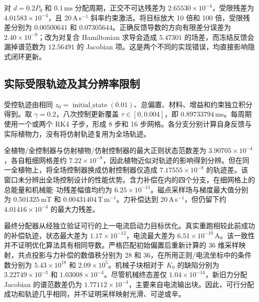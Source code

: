 对 $d=0.2P_0$ 和 $0.1$\,ms 分配周期，正交不可达残差为 $2.65530\times10^{-4}$，受限残差为 $4.01583\times10^{-4}$，且 20\,A\,s$^{-1}$ 斜率约束激活。将目标放大 10 倍和 100 倍，受限残差分别为 $0.00500641$ 和 $0.07305644$。正确反馈导数的方向有限差分误差为 $2.40\times10^{-9}$；改为对复合 Hamiltonian 求导会造成 $5.47301$ 的场差，而冻结反馈会漏掉谱范数为 $12.56491$ 的 Jacobian 项。这是两个不同的实现错误，均直接影响隐式闭环更新。

\subsection{实际受限轨迹及其分辨率限制}
受控轨迹由相同 $z_0=\operatorname{initial\_state}(0.01)$、总偏置、材料、增益和约束独立积分得到。取 $\gamma=0.2$，八次控制更新覆盖 $\tau\in[0,0.004]$，即 $0.89733794$\,ms。每周期使用一个或两个 RK4 子步，形成 8 步和 16 步网格。各分支分别计算自身反馈与实际植物力，没有将仿射轨迹复用为全场轨迹。

全植物/全控制器与仿射植物/仿射控制器的最大正则状态范数差为 $3.90705\times10^{-4}$，各自粗细网格差约 $7.22\times10^{-8}$，因此植物近似对轨迹的影响得到分辨。但在同一全植物上，将全场控制器换成仿射控制器仅造成 $7.17555\times10^{-8}$ 的轨迹差。该窗口未分辨出全场控制设计的性能优势。含力补偿在内的四个分支，在细网格上的总能量和机械能--功残差幅值均约为 $6.25\times10^{-11}$。磁点采样场与梯度最大值分别为 $0.501325$\,mT 和 $0.00431404$\,T\,m$^{-1}$。力补偿达到 20\,A\,s$^{-1}$，但仍留下约 $4.01416\times10^{-4}$ 的最大力残差。

最终分配器从经独立验证可行的上一电流启动力目标优化。真实重跑相较此前成功的补偿轨迹，状态最大差为 $1.17\times10^{-12}$，电流最大差为 $6.51\times10^{-10}$\,A。该一致性并不证明优化算法具有相同导数。严格匹配初始偏置后重新计算的 36 维采样映射，共点投影与力补偿的数值秩分别为 28 和 36，在所用正则/电流坐标中的条件数分别为 $5.43\times10^{18}$ 和 $2.09\times10^5$。机械子块相对于 $K_0$ 的缺陷分别为 $3.22749\times10^{-3}$ 和 $1.03008\times10^{-4}$。尽管机械终态差仅 $1.04\times10^{-14}$，新旧力分配 Jacobian 的谱范数差仍为 $1.77112\times10^{-4}$，主要来自电流输出块。因此，可行分配成功和轨迹几乎相同，并不证明采样映射光滑、可逆或辛。

